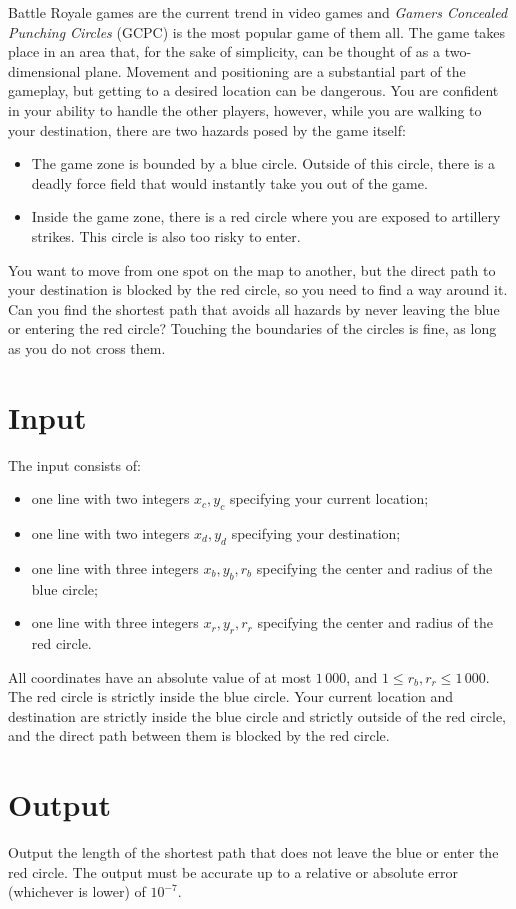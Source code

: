 Battle Royale games are the current trend in video games and \emph{Gamers Concealed Punching Circles} (GCPC) is the most popular game of them all.
The game takes place in an area that, for the sake of simplicity, can be thought of as a two-dimensional plane.
Movement and positioning are a substantial part of the gameplay, but getting to a desired location can be dangerous.
You are confident in your ability to handle the other players, however, while you are walking to your destination, there are two hazards posed by the game itself:
\begin{itemize}
  \item The game zone is bounded by a blue circle. Outside of this circle, there is a deadly force field that would instantly take you out of the game.
  \item Inside the game zone, there is a red circle where you are exposed to artillery strikes. This circle is also too risky to enter.
\end{itemize}

You want to move from one spot on the map to another, but the direct path to your destination is blocked by the red circle, so you need to find a way around it.
Can you find the shortest path that avoids all hazards by never leaving the blue or entering the red circle?
Touching the boundaries of the circles is fine, as long as you do not cross them.

\section*{Input}
The input consists of:
\begin{itemize}
  \item one line with two integers $x_c,y_c$ specifying your current location;
  \item one line with two integers $x_d,y_d$ specifying your destination;
  \item one line with three integers $x_b,y_b,r_b$ specifying the center and radius of the blue circle;
  \item one line with three integers $x_r,y_r,r_r$ specifying the center and radius of the red circle.
\end{itemize}
All coordinates have an absolute value of at most $1\,000$, and $1 \le r_b,r_r \le 1\,000$.
The red circle is strictly inside the blue circle.
Your current location and destination are strictly inside the blue circle and strictly outside of the red circle,
and the direct path between them is blocked by the red circle.
 
\section*{Output}
Output the length of the shortest path that does not leave the blue or enter the red circle.
The output must be accurate up to a relative or absolute error (whichever is lower) of $10^{-7}$.
